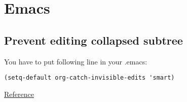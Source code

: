 \documentclass[11pt]{article}
\begin{document}
\section{Emacs}
\label{sec:org4778dde}
\subsection{Prevent editing collapsed subtree}
\label{sec:org23572ad}
You have to put following line in your .emacs:
\begin{verbatim}
(setq-default org-catch-invisible-edits 'smart)
\end{verbatim}

\href{https://emacs.stackexchange.com/questions/2086/org-mode-prevent-editing-of-text-within-collapsed-subtree}{Reference}
\end{document}
